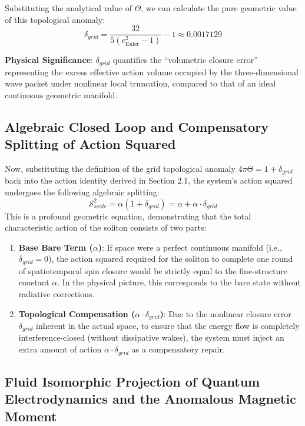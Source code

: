 \documentclass[12pt, a4paper]{article}
\begin{document}
Substituting the analytical value of $\Theta$, we can calculate the pure geometric value of this topological anomaly:
\begin{equation}
\delta_{grid} = \frac{32}{5(e_{\text{Euler}}^2 - 1)} - 1 \approx 0.0017129
\end{equation}

\textbf{Physical Significance}: $\delta_{grid}$ quantifies the ``volumetric closure error'' representing the excess effective action volume occupied by the three-dimensional wave packet under nonlinear local truncation, compared to that of an ideal continuous geometric manifold.

\subsection{Algebraic Closed Loop and Compensatory Splitting of Action Squared}

Now, substituting the definition of the grid topological anomaly $4\pi\Theta = 1 + \delta_{grid}$ back into the action identity derived in Section 2.1, the system's action squared undergoes the following algebraic splitting:
\begin{equation}
\mathcal{S}_{scale}^2 = \alpha (1 + \delta_{grid}) = \alpha + \alpha \cdot \delta_{grid}
\end{equation}
This is a profound geometric equation, demonstrating that the total characteristic action of the soliton consists of two parts:
\begin{enumerate}
    \item \textbf{Base Bare Term ($\alpha$)}: If space were a perfect continuous manifold (i.e., $\delta_{grid} = 0$), the action squared required for the soliton to complete one round of spatiotemporal spin closure would be strictly equal to the fine-structure constant $\alpha$. In the physical picture, this corresponds to the bare state without radiative corrections.
    \item \textbf{Topological Compensation ($\alpha \cdot \delta_{grid}$)}: Due to the nonlinear closure error $\delta_{grid}$ inherent in the actual space, to ensure that the energy flow is completely interference-closed (without dissipative wakes), the system must inject an extra amount of action $\alpha \cdot \delta_{grid}$ as a compensatory repair.
\end{enumerate}

\subsection{Fluid Isomorphic Projection of Quantum Electrodynamics and the Anomalous Magnetic Moment}
\end{document}
